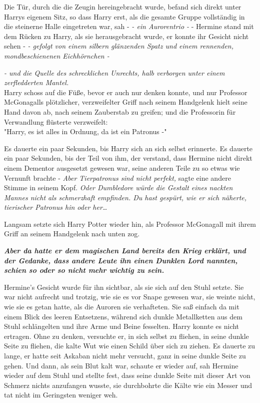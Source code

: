 {Die Tür, durch die die Zeugin hereingebracht wurde, befand sich direkt unter Harrys eigenem Sitz, so dass Harry erst, als die gesamte Gruppe vollständig in die steinerne Halle eingetreten war, sah - \emph{- ein Aurorentrio -} - Hermine stand mit dem Rücken zu Harry, als sie herausgebracht wurde, er konnte ihr Gesicht nicht sehen - \emph{- gefolgt von einem silbern glänzenden Spatz und einem rennenden, mondbeschienenen Eichhörnchen -}

\emph{- und die Quelle des schrecklichen Unrechts, halb verborgen unter einem zerfledderten Mantel.}\\

Harry schoss auf die Füße, bevor er auch nur denken konnte, und nur Professor McGonagalls plötzlicher, verzweifelter Griff nach seinem Handgelenk hielt seine Hand davon ab, nach seinem Zauberstab zu greifen; und die Professorin für Verwandlung flüsterte verzweifelt:\\ "Harry, es ist alles in Ordnung, da ist ein Patronus -"

Es dauerte ein paar Sekunden, bis Harry sich an sich selbst erinnerte. Es dauerte ein paar Sekunden, bis der Teil von ihm, der verstand, dass Hermine nicht direkt einem Dementor ausgesetzt gewesen war, seine anderen Teile zu so etwas wie Vernunft brachte - \emph{Aber Tierpatronus sind nicht perfekt,} sagte eine andere Stimme in seinem Kopf. \emph{Oder Dumbledore würde die Gestalt eines nackten Mannes nicht als schmerzhaft empfinden. Du hast gespürt, wie er sich näherte, tierischer Patronus hin oder her…}

Langsam setzte sich Harry Potter wieder hin, als Professor McGonagall mit ihrem Griff an seinem Handgelenk nach unten zog.

\textbf{\emph{Aber da hatte er dem magischen Land bereits den Krieg erklärt, und der Gedanke, dass andere Leute ihn einen Dunklen Lord nannten, schien so oder so nicht mehr wichtig zu sein.}}

Hermine's Gesicht wurde für ihn sichtbar, als sie sich auf den Stuhl setzte. Sie war nicht aufrecht und trotzig, wie sie es vor Snape gewesen war, sie weinte nicht, wie sie es getan hatte, als die Auroren sie verhafteten. Sie saß einfach da mit einem Blick des leeren Entsetzens, während sich dunkle Metallketten aus dem Stuhl schlängelten und ihre Arme und Beine fesselten. Harry konnte es nicht ertragen. Ohne zu denken, versuchte er, in sich selbst zu fliehen, in seine dunkle Seite zu fliehen, die kalte Wut wie einen Schild über sich zu ziehen. Es dauerte zu lange, er hatte seit Askaban nicht mehr versucht, ganz in seine dunkle Seite zu gehen. Und dann, als sein Blut kalt war, schaute er wieder auf, sah Hermine wieder auf dem Stuhl und stellte fest, dass seine dunkle Seite mit dieser Art von Schmerz nichts anzufangen wusste, sie durchbohrte die Kälte wie ein Messer und tat nicht im Geringsten weniger weh.

}
